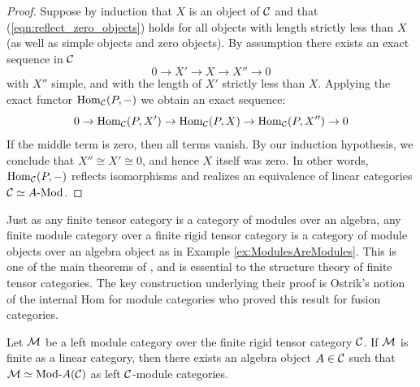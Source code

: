 \documentclass{amsart}
\begin{document}
\begin{proof}
Suppose by induction that $X$ is an object of $\mathcal C$ and that (\ref{eqn:reflect_zero_objects}) holds for all objects with length strictly less than $X$ (as well as simple objects and zero objects). By assumption there exists an exact sequence in $\mathcal C$
\begin{equation*}
	0 \to X' \to X \to X'' \to 0
\end{equation*}
with $X''$ simple, and with the length of $X'$ strictly less than $X$. Applying the exact functor $\operatorname{Hom}_{\mathcal C}(P,-)$ we obtain an exact sequence:
\begin{equation*}
	0 \to \operatorname{Hom}_{\mathcal C}(P,X') \to \operatorname{Hom}_{\mathcal C}(P,X) \to \operatorname{Hom}_{\mathcal C}(P,X'') \to 0
\end{equation*}
If the middle term is zero, then all terms vanish. By our induction hypothesis, we conclude that $X'' \cong X' \cong 0$, and hence $X$ itself was zero. In other words, $\operatorname{Hom}_{\mathcal C}(P,-)$ reflects isomorphisms and realizes an equivalence of linear categories $\cC \simeq \Mod{A}{}$.
\end{proof}

Just as any finite tensor category is a category of modules over an algebra, any finite module category over a finite rigid tensor category is a category of module objects over an algebra object as in Example \ref{ex:ModulesAreModules}.  This is one of the main theorems of \cite{EGNO}, and is essential to the structure theory of finite tensor categories.  The key construction underlying their proof is Ostrik's notion of the internal Hom for module categories \cite{MR1976459} who proved this result for fusion categories.



\begin{theorem} \label{thm:EGNO2.11.6} %
	Let $\mathcal M$ be a left module category over the finite rigid tensor category $\mathcal C$. If $\mathcal M$ is finite as a linear category, then there exists an algebra object $A \in \mathcal C$ such that $\cM \simeq \Mod{}{A} (\cC)$ as left $\mathcal C$-module categories. 
\end{theorem}
\end{document}

